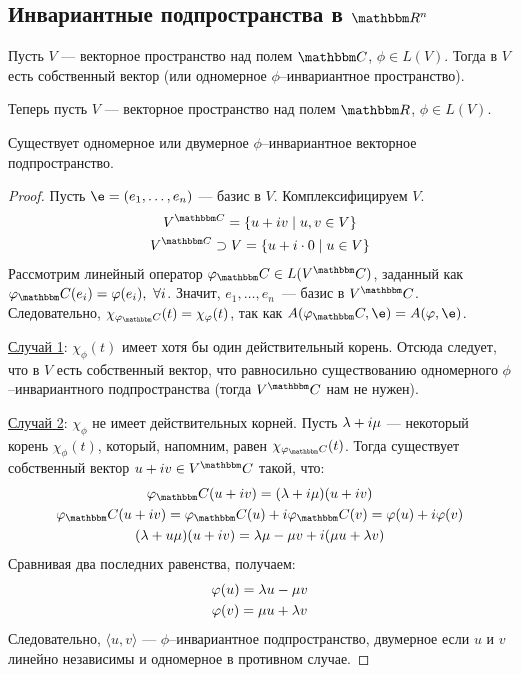 \subsection*{Инвариантные подпространства в $\R^n$}

Пусть $V$ --- векторное пространство над полем $\C$, $\phi \in L(V)$. Тогда в $V$ есть собственный вектор (или одномерное $\phi$--инвариантное пространство).

\vspace{0.2cm}
Теперь пусть $V$ --- векторное пространство над полем $\R$, $\phi \in L(V)$.

\begin{Theorem}
Существует одномерное или двумерное $\phi$--инвариантное векторное подпространство.
\end{Theorem}

\begin{proof}
Пусть $\e = (e_1, \ldots, e_n)$ --- базис в $V$. Комплексифицируем $V$.
\begin{gather*}
V^{\C} = \{ u + iv \mid u, v \in V \} \\
V^{\C} \supset V = \{u + i\cdot0 \mid u \in V  \}
\end{gather*}
Рассмотрим линейный оператор $\phi_\C \in L(V^\C)$, заданный как $\phi_\C(e_i) = \phi(e_i),\ \forall i$. Значит, $e_1, \ldots, e_n$~--- базис в $V^\C$. Следовательно, $\chi_{\phi_\C}(t) = \chi_\phi(t)$, так как $A(\phi_\C, \e) = A(\phi, \e)$.

\underline{Случай 1}: $\chi_\phi(t)$ имеет хотя бы один действительный корень. Отсюда следует, что в $V$ есть собственный вектор, что равносильно существованию одномерного $\phi$--инвариантного подпространства (тогда $V^\C$ нам не нужен).

\underline{Случай 2}: $\chi_\phi$ не имеет действительных корней. Пусть $\lambda + i\mu$ --- некоторый корень $\chi_\phi(t) $, который, напомним, равен $\chi_{\phi_\C}(t)$. Тогда существует собственный вектор $u+iv \in V^\C$ такой, что:
\begin{gather*}
\phi_\C(u+iv) = (\l + i\mu)(u+iv)\\
\phi_\C(u + iv) = \phi_\C(u) + i\phi_\C(v) = \phi(u) + i\phi(v) \\
(\l + u\mu)(u + iv) = \l \mu - \mu v + i(\mu u + \l v)
\end{gather*}
Сравнивая два последних равенства, получаем:
\begin{gather*}
\varphi(u) =  \lambda u - \mu v \\
\varphi(v) = \mu u + \lambda v
\end{gather*}
Следовательно, $\langle u, v \rangle$ --- $\phi$--инвариантное подпространство, двумерное если $u$ и $v$ линейно независимы и одномерное в противном случае.
\end{proof}

